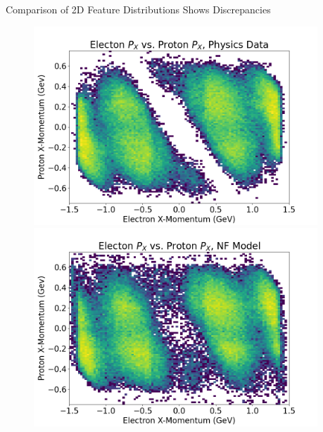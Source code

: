\documentclass[aspectratio=169]{beamer}
\begin{document}
\begin{frame}{Comparison of 2D Feature Distributions Shows Discrepancies}
\begin{figure}[!ht]
\begin{minipage}{.2573\textwidth}
    \end{minipage}%
    \begin{minipage}{0.2573\textwidth}
        \centering
        \includegraphics[width=0.95\textwidth,trim={0 0 0 0},clip]{images/Hists2D/Electon_P_X_vs_Proton_P_X,_Physics_Data.png}
        \includegraphics[width=0.95\textwidth,trim={0 0 0 0},clip]{images/Hists2D/Electon_P_X_vs_Proton_P_X,_NF_Model.png}
        


\end{minipage}
\end{figure}
\end{frame}
\end{document}

